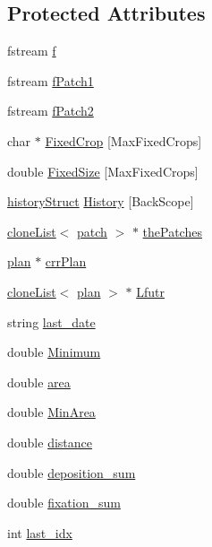 \subsection*{Protected Attributes}
\begin{DoxyCompactItemize}
\item 
fstream \hyperlink{classfield_a2d250d63f6438e6ebdfd1e4c4bf1292e}{f}
\item 
fstream \hyperlink{classfield_aa966c76aed1a50e17cdc88537b58f2bd}{fPatch1}
\item 
fstream \hyperlink{classfield_af93145dbed4cbdeaadfdae78c51893f9}{fPatch2}
\item 
char $\ast$ \hyperlink{classfield_aad91c5b34d09b1eceee5fd72cfce99bb}{FixedCrop} \mbox{[}MaxFixedCrops\mbox{]}
\item 
double \hyperlink{classfield_a99578e6e2a62c40659e95a97b4812543}{FixedSize} \mbox{[}MaxFixedCrops\mbox{]}
\item 
\hyperlink{structfield_1_1history_struct}{historyStruct} \hyperlink{classfield_a0a8c128c2386a858df6990959b468137}{History} \mbox{[}BackScope\mbox{]}
\item 
\hyperlink{classclone_list}{cloneList}$<$ \hyperlink{classpatch}{patch} $>$ $\ast$ \hyperlink{classfield_a4a4d06d397563e9bd4031f92acaaacc6}{thePatches}
\item 
\hyperlink{classplan}{plan} $\ast$ \hyperlink{classfield_ad9aa754f50edcc609d69051ade821958}{crrPlan}
\item 
\hyperlink{classclone_list}{cloneList}$<$ \hyperlink{classplan}{plan} $>$ $\ast$ \hyperlink{classfield_a06360b6852f2e8f6348924d7bb3564b2}{Lfutr}
\item 
string \hyperlink{classfield_a516bfd09956ed9ece6cbac427205607e}{last\_\-date}
\item 
double \hyperlink{classfield_a8821f9d047c11b19d393c8ae2b6f2028}{Minimum}
\item 
double \hyperlink{classfield_a500a3007e7d5ce1b18e950abbe4c7a21}{area}
\item 
double \hyperlink{classfield_ab8da800fdceae26674ff4c49457b7911}{MinArea}
\item 
double \hyperlink{classfield_a477599b3c8ed6a953d27dc2d2db2cfcc}{distance}
\item 
double \hyperlink{classfield_ab8ea98f5c1a6daf2e61deb15c6b3370e}{deposition\_\-sum}
\item 
double \hyperlink{classfield_a5b73ff6306457cefd90df1f718595008}{fixation\_\-sum}
\item 
int \hyperlink{classfield_a8f1b394ff56f186e875fac2fbcaa29d9}{last\_\-idx}

\end{DoxyCompactItemize}
